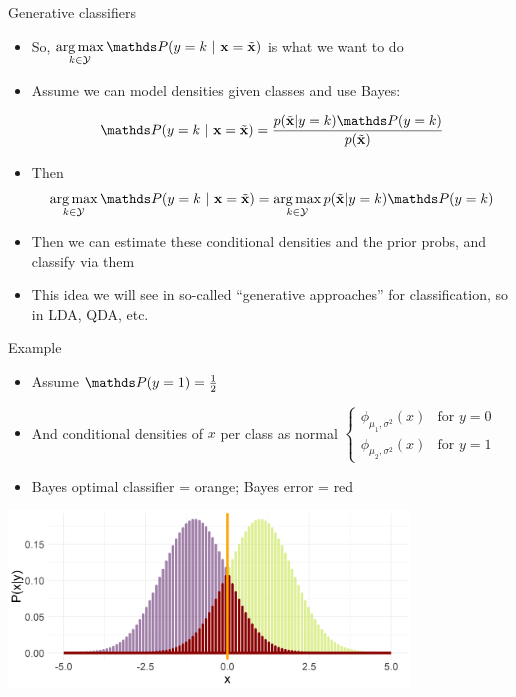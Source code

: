 \documentclass[11pt,compress,t,notes=noshow, xcolor=table]{beamer}
\begin{document}
\begin{vbframe}{Generative classifiers}

\begin{itemize}

\item So, $\argmaxlim_{k \in \Yspace} \P(y = k~|~ \xv = \xtil)$ is what we want to do

\item Assume we can model densities given classes and use Bayes:

$$
\P(y = k~|~ \xv = \xtil)  = \frac{p(\xtil | y = k) \P(y = k)} {p(\xtil)} 
$$

\item Then
$$
\argmax_{k \in \Yspace} \P(y = k~|~ \xv = \xtil) = \argmax_{k \in \Yspace}  p(\xtil | y = k) \P(y = k)
$$
\item Then we can estimate these conditional densities and the prior probs, and classify via them

\item This idea we will see in so-called ``generative approaches'' for classification, so in LDA, QDA, etc.


\end{itemize}

\end{vbframe}


\begin{vbframe}{Example}

\begin{itemize}

\item  Assume $\P(y = 1) = \frac{1}{2}$ 
\item And conditional densities of $x$ per class as normal $
\begin{cases}
\phi_{\mu_1, \sigma^2}(x) & \text{for } y = 0\\ 
\phi_{\mu_2, \sigma^2}(x) & \text{for } y = 1
\end{cases}$

\item Bayes optimal classifier = orange; Bayes error = red 

\end{itemize}


\begin{center}
\includegraphics[width = 0.8\textwidth]{figure/bayes_error_5.png} 
\end{center}


\end{vbframe}

\endlecture
\end{document}
